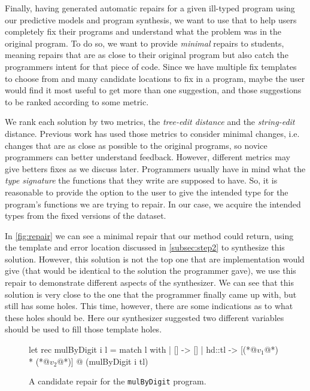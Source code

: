Finally, having generated automatic repairs for a given ill-typed program using
our predictive models and program synthesis, we want to use that to help users
completely fix their programs and understand what the problem was in the
original program. To do so, we want to provide \emph{minimal} repairs to
students, meaning repairs that are as close to their original program but also
catch the programmers intent for that piece of code. Since we have multiple fix
templates to choose from and many candidate locations to fix in a program, maybe
the user would find it most useful to get more than one suggestion, and those
suggestions to be ranked according to some metric.

 We rank each solution by two metrics, the
\emph{tree-edit distance} and the \emph{string-edit} distance. Previous work has
used those metrics to consider minimal changes, i.e. changes that are as close
as possible to the original programs, so novice programmers can better
understand feedback. However, different metrics may give betters fixes as we
discuss later. Programmers usually have in mind what the \emph{type signature}
the functions that they write are supposed to have. So, it is reasonable to
provide the option to the user to give the intended type for the program's
functions we are trying to repair. In our case, we acquire the intended types
from the fixed versions of the dataset.

 In \autoref{fig:repair} we can see a minimal repair that our
method could return, using the template and error location discussed in
\autoref{subsec:step2} to synthesize this solution. However, this solution is
not the top one that are implementation would give (that would be identical to
the solution the programmer gave), we use this repair to demonstrate different
aspects of the synthesizer. We can see that this solution is very close to the
one that the programmer finally came up with, but still has some holes. This
time, however, there are some indications as to what these holes should be. Here
our synthesizer suggested two different variables should be used to fill those
template holes.

\begin{figure}[ht]
\begin{ecode}
let rec mulByDigit i l =
  match l with
  | []     -> []
  | hd::tl -> [(*@$v_1$@*) * (*@$v_2$@*)] @ (mulByDigit i tl)
\end{ecode}
\caption{A candidate repair for the \texttt{mulByDigit} program.}
\label{fig:repair}
\end{figure}
